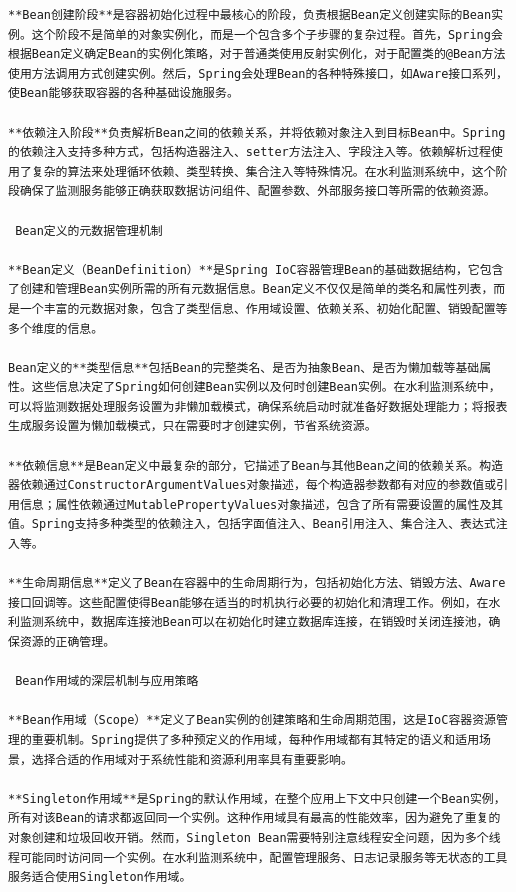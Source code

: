 \begin{lstlisting}
**Bean创建阶段**是容器初始化过程中最核心的阶段，负责根据Bean定义创建实际的Bean实例。这个阶段不是简单的对象实例化，而是一个包含多个子步骤的复杂过程。首先，Spring会根据Bean定义确定Bean的实例化策略，对于普通类使用反射实例化，对于配置类的@Bean方法使用方法调用方式创建实例。然后，Spring会处理Bean的各种特殊接口，如Aware接口系列，使Bean能够获取容器的各种基础设施服务。

**依赖注入阶段**负责解析Bean之间的依赖关系，并将依赖对象注入到目标Bean中。Spring的依赖注入支持多种方式，包括构造器注入、setter方法注入、字段注入等。依赖解析过程使用了复杂的算法来处理循环依赖、类型转换、集合注入等特殊情况。在水利监测系统中，这个阶段确保了监测服务能够正确获取数据访问组件、配置参数、外部服务接口等所需的依赖资源。

 Bean定义的元数据管理机制

**Bean定义（BeanDefinition）**是Spring IoC容器管理Bean的基础数据结构，它包含了创建和管理Bean实例所需的所有元数据信息。Bean定义不仅仅是简单的类名和属性列表，而是一个丰富的元数据对象，包含了类型信息、作用域设置、依赖关系、初始化配置、销毁配置等多个维度的信息。

Bean定义的**类型信息**包括Bean的完整类名、是否为抽象Bean、是否为懒加载等基础属性。这些信息决定了Spring如何创建Bean实例以及何时创建Bean实例。在水利监测系统中，可以将监测数据处理服务设置为非懒加载模式，确保系统启动时就准备好数据处理能力；将报表生成服务设置为懒加载模式，只在需要时才创建实例，节省系统资源。

**依赖信息**是Bean定义中最复杂的部分，它描述了Bean与其他Bean之间的依赖关系。构造器依赖通过ConstructorArgumentValues对象描述，每个构造器参数都有对应的参数值或引用信息；属性依赖通过MutablePropertyValues对象描述，包含了所有需要设置的属性及其值。Spring支持多种类型的依赖注入，包括字面值注入、Bean引用注入、集合注入、表达式注入等。

**生命周期信息**定义了Bean在容器中的生命周期行为，包括初始化方法、销毁方法、Aware接口回调等。这些配置使得Bean能够在适当的时机执行必要的初始化和清理工作。例如，在水利监测系统中，数据库连接池Bean可以在初始化时建立数据库连接，在销毁时关闭连接池，确保资源的正确管理。

 Bean作用域的深层机制与应用策略

**Bean作用域（Scope）**定义了Bean实例的创建策略和生命周期范围，这是IoC容器资源管理的重要机制。Spring提供了多种预定义的作用域，每种作用域都有其特定的语义和适用场景，选择合适的作用域对于系统性能和资源利用率具有重要影响。

**Singleton作用域**是Spring的默认作用域，在整个应用上下文中只创建一个Bean实例，所有对该Bean的请求都返回同一个实例。这种作用域具有最高的性能效率，因为避免了重复的对象创建和垃圾回收开销。然而，Singleton Bean需要特别注意线程安全问题，因为多个线程可能同时访问同一个实例。在水利监测系统中，配置管理服务、日志记录服务等无状态的工具服务适合使用Singleton作用域。


\end{lstlisting}
